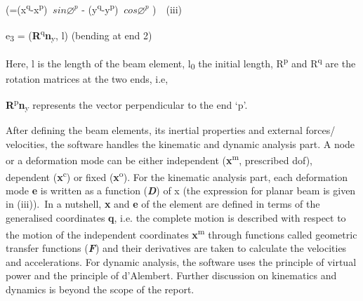 \documentclass[12pt]{report}
\begin{document}
\begin{FlushLeft}
(=(x\textsuperscript{q}-x\textsuperscript{p}) \( ~sin \varnothing ^{p} \)  - (y\textsuperscript{q}-y\textsuperscript{p}) \( ~cos \varnothing ^{p} \) )\ \  (iii)
\end{FlushLeft}\par

\begin{FlushLeft}
e\textsubscript{3} = (\textbf{R}\textsuperscript{q}\textbf{n}\textsubscript{y}, l) (bending at end 2)
\end{FlushLeft}\par

Here, l is the length of the beam element, l\textsubscript{0} the initial length, R\textsuperscript{p} and R\textsuperscript{q} are the rotation matrices at the two ends, i.e,\par

\par 
\begin{adjustwidth}{3.5in}{0.0in}
\textbf{R}\textsuperscript{p}\textbf{n}\textsubscript{y} represents the vector perpendicular to the end ‘p’.\par

\end{adjustwidth}

After defining the beam elements, its inertial properties and external forces/ velocities, the software handles the kinematic and dynamic analysis part. A node or a deformation mode can be either independent (\textbf{x}\textsuperscript{m}, prescribed dof), dependent (\textbf{x}\textsuperscript{c}) or fixed (\textbf{x}\textsuperscript{o}). For the kinematic analysis part, each deformation mode \textbf{e} is written as a function (\textbf{\textit{D}}) of x (the expression for planar beam is given in (iii)).\  In a nutshell, \textbf{x} and \textbf{e} of the element are defined in terms of the generalised coordinates \textbf{q}, i.e. the complete motion is described with respect to the motion of the independent coordinates \textbf{x}\textsuperscript{m} through functions called geometric transfer functions (\textbf{\textit{F}}) and their derivatives are taken to calculate the velocities and accelerations. For dynamic analysis, the software uses the principle of virtual power and the principle of d’Alembert. Further discussion on kinematics and dynamics is beyond the scope of the report.\par
\end{document}
